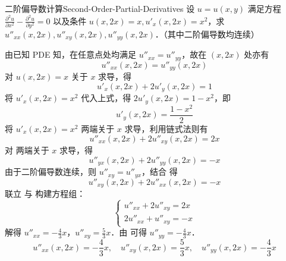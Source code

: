 \begin{problem}{二阶偏导数计算}{Second-Order-Partial-Derivatives}
    设 $u = u(x, y)$ 满足方程 $\frac{\partial^2 u}{\partial x^2} - \frac{\partial^2 u}{\partial y^2} = 0$ 以及条件 $u(x, 2x) = x, u'_x(x, 2x) = x^2$，求 $u''_{xx}(x, 2x), u''_{xy}(x, 2x), u''_{yy}(x, 2x)$．（其中二阶偏导数均连续）
\end{problem}

\begin{solution}
    由已知 PDE 知，在任意点处均满足 $u''_{xx} = u''_{yy}$，故在 $(x, 2x)$ 处亦有
    \begin{equation}\label{eq:pde-1}
        u''_{xx}(x, 2x) = u''_{yy}(x, 2x)
    \end{equation}
    对 $u(x, 2x) = x$ 关于 $x$ 求导，得
    \begin{equation}
        u'_x(x, 2x) + 2u'_y(x, 2x) = 1
    \end{equation}
    将 $u'_x(x, 2x) = x^2$ 代入上式，得 $2u'_y(x, 2x) = 1 - x^2$，即
    \begin{equation}\label{eq:uy-val}
        u'_y(x, 2x) = \frac{1 - x^2}{2}
    \end{equation}
    将 $u'_x(x, 2x) = x^2$ 两端关于 $x$ 求导，利用链式法则有
    \begin{equation}\label{eq:uxx-1}
        u''_{xx}(x, 2x) + 2u''_{xy}(x, 2x) = 2x
    \end{equation}
    对  两端关于 $x$ 求导，得
    \begin{equation}
        u''_{yx}(x, 2x) + 2u''_{yy}(x, 2x) = -x
    \end{equation}
    由于二阶偏导数连续，则 $u''_{xy} = u''_{yx}$，结合  得
    \begin{equation}\label{eq:uxx-2}
        u''_{xy}(x, 2x) + 2u''_{xx}(x, 2x) = -x
    \end{equation}
    联立  与  构建方程组：
    \begin{equation}
        \begin{cases}
            u''_{xx} + 2u''_{xy} = 2x \\
            2u''_{xx} + u''_{xy} = -x
        \end{cases}
    \end{equation}
    解得 $u''_{xx} = -\frac{4}{3}x$，$u''_{xy} = \frac{5}{3}x$．由  可得 $u''_{yy} = -\frac{4}{3}x$．
    \begin{equation}
        \boxed{u''_{xx}(x, 2x) = -\frac{4}{3}x, \quad u''_{xy}(x, 2x) = \frac{5}{3}x, \quad u''_{yy}(x, 2x) = -\frac{4}{3}x}
    \end{equation}
\end{solution}



